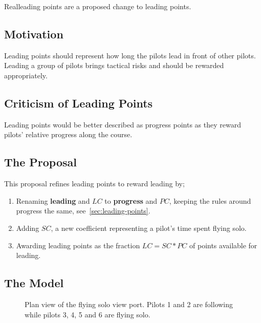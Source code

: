 \documentclass[gap.tex]{subfiles}
\begin{document}
\label{sec:real-leading}
Real\footnotemark leading points are a proposed change to leading points.

\subsection{Motivation}
Leading points should represent how long the pilots lead in front of other
pilots. Leading a group of pilots brings tactical risks and should be rewarded
appropriately.

\subsection{Criticism of Leading Points}
Leading points would be better described as progress points as they reward
pilots' relative progress along the course.

\subsection{The Proposal}
This proposal refines leading points to reward leading by;

\begin{enumerate}
    \item Renaming \textbf{leading} and \(LC\) to \textbf{progress} and \(PC\),
        keeping the rules around progress the same,
        see~\ref{sec:leading-points}.

    \item Adding \(SC\), a new coefficient representing a pilot's time spent
        flying solo.

    \item Awarding leading points as the fraction \(LC = SC * PC\) of points
        available for leading.
\end{enumerate}

\newpage
\subsection{The Model}

\begin{figure}[ht]
    \centering
    
    \caption{Plan view of the flying solo view port. Pilots 1 and 2 are following while pilots 3, 4, 5 and 6 are flying solo.}
    \label{fig:view-port}
\end{figure}
\end{document}
